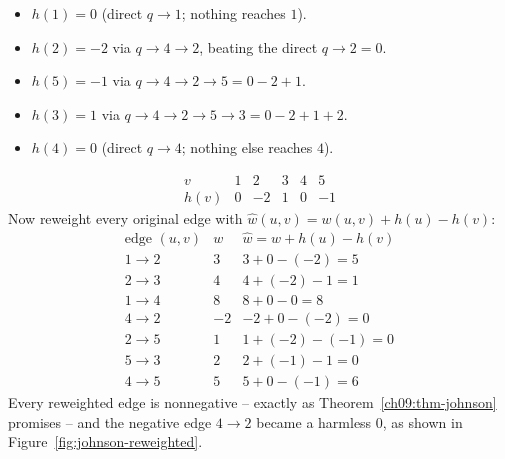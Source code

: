 \begin{itemize}
  \item $h(1)=0$ (direct $q\to1$; nothing reaches $1$).
  \item $h(2)=-2$ via $q\to4\to2$, beating the direct $q\to2=0$.
  \item $h(5)=-1$ via $q\to4\to2\to5 = 0-2+1$.
  \item $h(3)=1$ via $q\to4\to2\to5\to3 = 0-2+1+2$.
  \item $h(4)=0$ (direct $q\to4$; nothing else reaches $4$).
\end{itemize}
\[
\begin{array}{c|ccccc}
 v & 1 & 2 & 3 & 4 & 5\\\hline
 h(v) & 0 & -2 & 1 & 0 & -1
\end{array}
\]
Now reweight every original edge with $\hat{w}(u,v)=w(u,v)+h(u)-h(v)$:
\[
\begin{array}{l|c|c}
\text{edge } (u,v) & w & \hat{w}=w+h(u)-h(v)\\\hline
1\to2 & 3 & 3+0-(-2)=5\\
2\to3 & 4 & 4+(-2)-1=1\\
1\to4 & 8 & 8+0-0=8\\
4\to2 & -2 & -2+0-(-2)=0\\
2\to5 & 1 & 1+(-2)-(-1)=0\\
5\to3 & 2 & 2+(-1)-1=0\\
4\to5 & 5 & 5+0-(-1)=6
\end{array}
\]
Every reweighted edge is nonnegative -- exactly as Theorem~\ref{ch09:thm-johnson} promises -- and the
negative edge $4\to2$ became a harmless $0$, as shown in Figure~\ref{fig:johnson-reweighted}.

